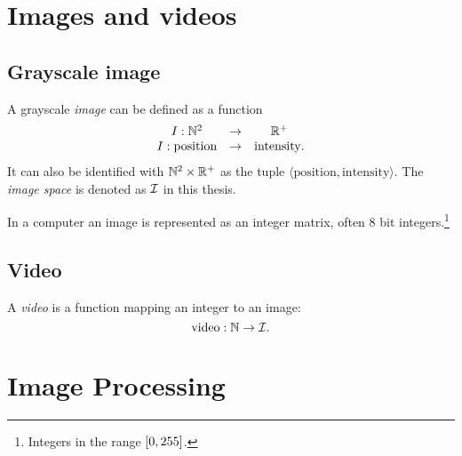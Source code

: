 

\section{Images and videos}
\subsection{Grayscale image}
\begin{definition}

  A grayscale \emph{image} can be defined as a function
  \begin{equation}
    \begin{array}{ccc}
      I : \mathbb{N}^2 &\rightarrow& \mathbb{R}^+\\
      I : \text{position}&\rightarrow&\text{intensity}.
    \end{array}
  \end{equation}
  It can also be identified with $\mathbb{N}^2\times \mathbb{R}^+$ as the tuple
  $\langle \text{position}, \text{intensity}\rangle$. The \emph{image
    space} is denoted as $\mathcal{I}$ in this thesis.

  In a computer an image is represented as an integer matrix, often 8
  bit integers.\footnote{Integers in the range $\left[0, 255\right]$.}
\end{definition}

\subsection{Video}
\begin{definition}
  A \emph{video} is a function mapping an integer to an image:
  \begin{equation}
    \text{video} : \mathbb{N} \rightarrow \mathcal{I}.
  \end{equation}
\end{definition}

\section{Image Processing}

